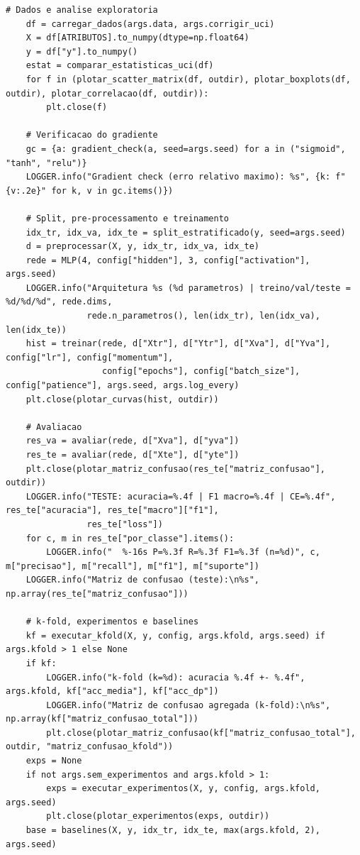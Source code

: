 \documentclass[12pt,a4paper]{article}
\begin{document}
{\begin{lstlisting}[caption={Programa completo \texttt{iris\_mlp.py}.},label={lst:iris_mlp}]
    # Dados e analise exploratoria
    df = carregar_dados(args.data, args.corrigir_uci)
    X = df[ATRIBUTOS].to_numpy(dtype=np.float64)
    y = df["y"].to_numpy()
    estat = comparar_estatisticas_uci(df)
    for f in (plotar_scatter_matrix(df, outdir), plotar_boxplots(df, outdir), plotar_correlacao(df, outdir)):
        plt.close(f)

    # Verificacao do gradiente
    gc = {a: gradient_check(a, seed=args.seed) for a in ("sigmoid", "tanh", "relu")}
    LOGGER.info("Gradient check (erro relativo maximo): %s", {k: f"{v:.2e}" for k, v in gc.items()})

    # Split, pre-processamento e treinamento
    idx_tr, idx_va, idx_te = split_estratificado(y, seed=args.seed)
    d = preprocessar(X, y, idx_tr, idx_va, idx_te)
    rede = MLP(4, config["hidden"], 3, config["activation"], args.seed)
    LOGGER.info("Arquitetura %s (%d parametros) | treino/val/teste = %d/%d/%d", rede.dims,
                rede.n_parametros(), len(idx_tr), len(idx_va), len(idx_te))
    hist = treinar(rede, d["Xtr"], d["Ytr"], d["Xva"], d["Yva"], config["lr"], config["momentum"],
                   config["epochs"], config["batch_size"], config["patience"], args.seed, args.log_every)
    plt.close(plotar_curvas(hist, outdir))

    # Avaliacao
    res_va = avaliar(rede, d["Xva"], d["yva"])
    res_te = avaliar(rede, d["Xte"], d["yte"])
    plt.close(plotar_matriz_confusao(res_te["matriz_confusao"], outdir))
    LOGGER.info("TESTE: acuracia=%.4f | F1 macro=%.4f | CE=%.4f", res_te["acuracia"], res_te["macro"]["f1"],
                res_te["loss"])
    for c, m in res_te["por_classe"].items():
        LOGGER.info("  %-16s P=%.3f R=%.3f F1=%.3f (n=%d)", c, m["precisao"], m["recall"], m["f1"], m["suporte"])
    LOGGER.info("Matriz de confusao (teste):\n%s", np.array(res_te["matriz_confusao"]))

    # k-fold, experimentos e baselines
    kf = executar_kfold(X, y, config, args.kfold, args.seed) if args.kfold > 1 else None
    if kf:
        LOGGER.info("k-fold (k=%d): acuracia %.4f +- %.4f", args.kfold, kf["acc_media"], kf["acc_dp"])
        LOGGER.info("Matriz de confusao agregada (k-fold):\n%s", np.array(kf["matriz_confusao_total"]))
        plt.close(plotar_matriz_confusao(kf["matriz_confusao_total"], outdir, "matriz_confusao_kfold"))
    exps = None
    if not args.sem_experimentos and args.kfold > 1:
        exps = executar_experimentos(X, y, config, args.kfold, args.seed)
        plt.close(plotar_experimentos(exps, outdir))
    base = baselines(X, y, idx_tr, idx_te, max(args.kfold, 2), args.seed)


\end{lstlisting}}
\end{document}
